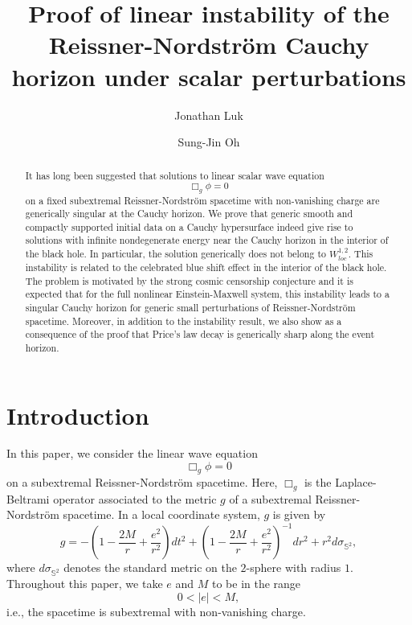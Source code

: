 \documentclass[12 pt, reqno]{amsart}
\theoremstyle{definition}
\theoremstyle{remark}
\numberwithin{equation}{section}
\newcommand{\0}{\emptyset}
\newcommand{\f}{\frac}
\begin{document}
\title[]{Proof of linear instability of the Reissner-Nordstr\"om Cauchy horizon under scalar perturbations}%
\author{Jonathan Luk}
\address{Department of Pure Mathematics and Mathematical Statistics, Cambridge University, Cambridge CB3 0WB, UK}

\author{Sung-Jin Oh}%
\address{Department of Mathematics, UC Berkeley, Berkeley, CA 94720, USA}%
%


\begin{abstract}
It has long been suggested that solutions to linear scalar wave equation
$$\Box_g\phi=0$$
on a fixed subextremal Reissner-Nordstr\"om spacetime with non-vanishing charge are generically singular at the Cauchy horizon. We prove that generic smooth and compactly supported initial data on a Cauchy hypersurface indeed give rise to solutions with infinite nondegenerate energy near the Cauchy horizon in the interior of the black hole. In particular, the solution generically does not belong to $W^{1,2}_{loc}$. This instability is related to the celebrated blue shift effect in the interior of the black hole. The problem is motivated by the strong cosmic censorship conjecture and it is expected that for the full nonlinear Einstein-Maxwell system, this instability leads to a singular Cauchy horizon for generic small perturbations of Reissner-Nordstr\"om spacetime. Moreover, in addition to the instability result, we also show as a consequence of the proof that Price's law decay is generically sharp along the event horizon.
\end{abstract}

\maketitle

\section{Introduction}
In this paper, we consider the linear wave equation 
\begin{equation}\label{wave.eqn}
\Box_g\phi=0
\end{equation}
on a subextremal Reissner-Nordstr\"om spacetime.  Here, $\Box_g$ is the Laplace-Beltrami operator associated to the metric $g$ of a subextremal Reissner-Nordstr\"om spacetime. In a local coordinate system, $g$ is given by
$$g=-(1-\f {2M} r+\f{e^2}{r^2})dt^2+(1-\f {2M} r+\f{e^2}{r^2})^{-1} dr^2+r^2 d\sigma_{\mathbb S^2},$$
where $d\sigma_{\mathbb S^2}$ denotes the standard metric on the $2$-sphere with radius $1$. Throughout this paper, we take $e$ and $M$ to be in the range
$$0<|e|<M,$$
i.e., the spacetime is subextremal with non-vanishing charge. 
\end{document}
